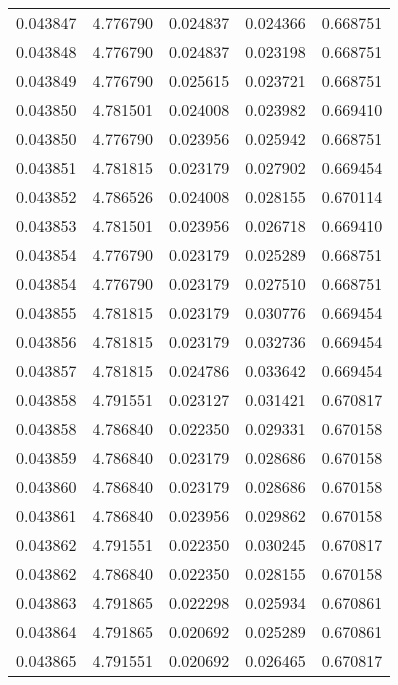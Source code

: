 \begin{tabular}{lrrrr}
0.043847    &  4.776790 &  0.024837 &  0.024366 &             0.668751 \\
0.043848    &  4.776790 &  0.024837 &  0.023198 &             0.668751 \\
0.043849    &  4.776790 &  0.025615 &  0.023721 &             0.668751 \\
0.043850    &  4.781501 &  0.024008 &  0.023982 &             0.669410 \\
0.043850    &  4.776790 &  0.023956 &  0.025942 &             0.668751 \\
0.043851    &  4.781815 &  0.023179 &  0.027902 &             0.669454 \\
0.043852    &  4.786526 &  0.024008 &  0.028155 &             0.670114 \\
0.043853    &  4.781501 &  0.023956 &  0.026718 &             0.669410 \\
0.043854    &  4.776790 &  0.023179 &  0.025289 &             0.668751 \\
0.043854    &  4.776790 &  0.023179 &  0.027510 &             0.668751 \\
0.043855    &  4.781815 &  0.023179 &  0.030776 &             0.669454 \\
0.043856    &  4.781815 &  0.023179 &  0.032736 &             0.669454 \\
0.043857    &  4.781815 &  0.024786 &  0.033642 &             0.669454 \\
0.043858    &  4.791551 &  0.023127 &  0.031421 &             0.670817 \\
0.043858    &  4.786840 &  0.022350 &  0.029331 &             0.670158 \\
0.043859    &  4.786840 &  0.023179 &  0.028686 &             0.670158 \\
0.043860    &  4.786840 &  0.023179 &  0.028686 &             0.670158 \\
0.043861    &  4.786840 &  0.023956 &  0.029862 &             0.670158 \\
0.043862    &  4.791551 &  0.022350 &  0.030245 &             0.670817 \\
0.043862    &  4.786840 &  0.022350 &  0.028155 &             0.670158 \\
0.043863    &  4.791865 &  0.022298 &  0.025934 &             0.670861 \\
0.043864    &  4.791865 &  0.020692 &  0.025289 &             0.670861 \\
0.043865    &  4.791551 &  0.020692 &  0.026465 &             0.670817 \\

\end{tabular}
